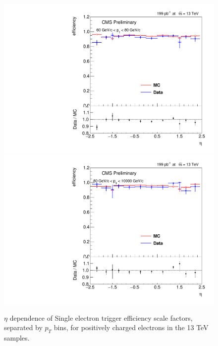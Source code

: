 \begin{figure}
\includegraphics[width=0.48\linewidth]{plots/efficiency/13_zeehlt_positive/PtBins_eta_pt10.pdf}
\includegraphics[width=0.48\linewidth]{plots/efficiency/13_zeehlt_positive/PtBins_eta_pt11.pdf}
\caption{$\eta$ dependence of Single electron trigger efficiency scale factors, separated by $p_T$ bins, for positively charged electrons in the 13 TeV samples.}
\label{fig:Eff:el:13:HLT:pos}
\end{figure}
